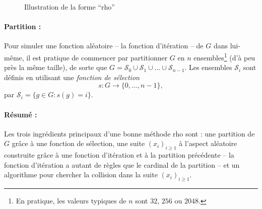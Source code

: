 \documentclass[a4paper, titlepage]{article}
\theoremstyle{definition}
\theoremstyle{remark}
\begin{document}
\begin{figure}[h]
\begin{center}
\caption{Illustration de la forme ``rho''}
\end{center}
\end{figure}

\paragraph*{Partition :} Pour simuler une fonction aléatoire -- la fonction d'itération -- de $G$ dans lui-même, il est pratique de commencer par partitionner $G$ en $n$ ensembles\footnote{En pratique, les valeurs typiques de $n$ sont $32$, $256$ ou $2048$.} (d’à peu près la même taille), de sorte que $G = \mathcal{S}_0 \cup  \mathcal{S}_1 \cup \dots \cup \mathcal{S}_{n-1}$. Les ensembles $\mathcal{S}_i$ sont définis en utilisant une \textit{fonction de sélection} $$s : G \rightarrow \{0, \dots, n-1 \},$$ par $\mathcal{S}_i = \{g \in G : s(g) = i\}$. 

\paragraph*{Résumé :} Les trois ingrédients principaux d'une bonne méthode rho sont : une partition de $G$ grâce à une fonction de sélection, une suite ${(x_i)}_{i\geqslant 1}$ à l'aspect aléatoire construite grâce à une fonction d'itération et à la partition précédente -- la fonction d'itération a autant de règles que le cardinal de la partition -- et un algorithme pour chercher la collision dans la suite ${(x_i)}_{i\geqslant 1}$.
\end{document}
